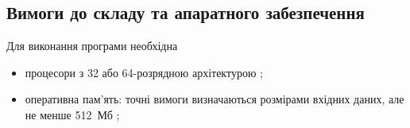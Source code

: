 \documentclass[ukrainian,utf8,pointsubsection,simple]{eskdtext}
\begin{document}
\subsection{Вимоги до складу та апаратного забезпечення}
Для виконання програми необхідна \TBD
\begin{itemize}
\item процесори з 32 або 64-розрядною архітектурою \TBD;

\item оперативна пам'ять: точні вимоги визначаються розмірами вхідних даних, але не менше 512~Мб \TBD;

\end{itemize}
\end{document}
